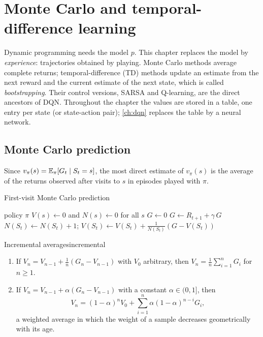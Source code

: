 \chapter{Monte Carlo and temporal-difference learning}
\label{ch:td}

Dynamic programming needs the model $p$. This chapter replaces the model by
\emph{experience}: trajectories obtained by playing. Monte Carlo methods
average complete returns; temporal-difference (TD) methods update an
estimate from the next reward and the current estimate of the next state,
which is called \emph{bootstrapping}. Their control versions, SARSA and
Q-learning, are the direct ancestors of DQN. Throughout the chapter the
values are stored in a table, one entry per state (or state-action pair);
\cref{ch:dqn} replaces the table by a neural network.

\section{Monte Carlo prediction}

Since $v_\pi(s) = \mathbb{E}_\pi[G_t \mid S_t = s]$, the most direct estimate of
$v_\pi(s)$ is the average of the returns observed after visits to $s$ in
episodes played with $\pi$.

\begin{algobox}{First-visit Monte Carlo prediction}
  \begin{algorithmic}[1]
    \Require policy $\pi$
    \State $V(s) \gets 0$ and $N(s) \gets 0$ for all $s$
      \State $G \gets 0$
        \State $G \gets R_{t+1} + \gamma\, G$
          \State $N(S_t) \gets N(S_t) + 1$;\quad
            $V(S_t) \gets V(S_t) + \frac{1}{N(S_t)} \left( G - V(S_t)
            \right)$
        \EndIf
      \EndFor
    \EndFor
  \end{algorithmic}
\end{algobox}

\begin{proposition}{Incremental averages}{incremental}
  \begin{enumerate}[nosep, label=(\roman*)]
    \item If $V_n = V_{n-1} + \frac{1}{n} (G_n - V_{n-1})$ with $V_0$
      arbitrary, then $V_n = \frac{1}{n} \sum_{i=1}^{n} G_i$ for $n \geq
      1$.
    \item If $V_n = V_{n-1} + \alpha (G_n - V_{n-1})$ with a constant
      $\alpha \in (0, 1]$, then
      \begin{equation}
        V_n = (1 - \alpha)^n V_0 + \sum_{i=1}^{n} \alpha (1 - \alpha)^{n-i}
        G_i,
      \end{equation}
      a weighted average in which the weight of a sample decreases
      geometrically with its age.
  \end{enumerate}
\end{proposition}

